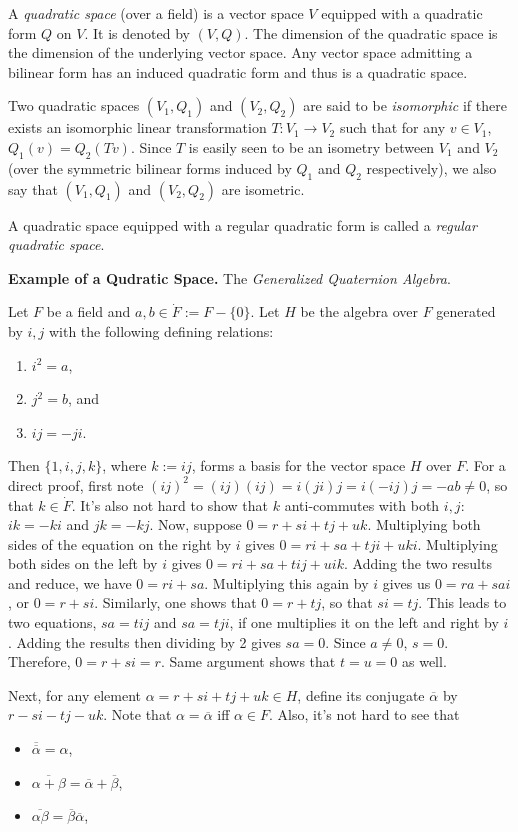 \documentclass[12pt]{article}
\begin{document}
A \emph{quadratic space} (over a field) is a vector space $V$ equipped with a quadratic form $Q$ on $V$.  It is denoted by $(V,Q)$.  The dimension of the quadratic space is the dimension of the underlying vector space.  Any vector space admitting a bilinear form has an induced quadratic form and thus is a quadratic space.

Two quadratic spaces $(V_1,Q_1)$ and $(V_2,Q_2)$ are said to be \emph{isomorphic} if there exists an isomorphic linear transformation $T:V_1\to V_2$ such that for any $v\in V_1$, $Q_1(v)=Q_2(Tv)$.  Since $T$ is easily seen to be an isometry between $V_1$ and $V_2$ (over the symmetric bilinear forms induced by $Q_1$ and $Q_2$ respectively), we also say that $(V_1,Q_1)$ and $(V_2,Q_2)$ are isometric.

A quadratic space equipped with a regular quadratic form is called a \emph{regular quadratic space}.

\textbf{Example of a Qudratic Space.}  The \emph{Generalized Quaternion Algebra}.

Let $F$ be a field and $a,b\in \dot{F}:=F-\lbrace 0\rbrace$.  Let $H$ be the algebra over $F$ generated by $i,j$ with the following defining relations:
\begin{enumerate}
\item $i^2=a$,
\item $j^2=b$, and
\item $ij=-ji$.
\end{enumerate}
Then $\lbrace 1,i,j,k\rbrace$, where $k:=ij$, forms a basis for the vector space $H$ over $F$.  For a direct proof, first note $(ij)^2=(ij)(ij)=i(ji)j=i(-ij)j=-ab\neq 0$, so that $k\in\dot{F}$.  It's also not hard to show that $k$ anti-commutes with both $i,j$: $ik=-ki$ and $jk=-kj$.  Now, suppose $0=r+si+tj+uk$.  Multiplying both sides of the equation on the right by $i$ gives $0=ri+sa+tji+uki$.  Multiplying both sides on the left by $i$ gives $0=ri+sa+tij+uik$.  Adding the two results and reduce, we have $0=ri+sa$.  Multiplying this again by $i$ gives us $0=ra+sai$, or $0=r+si$.  Similarly, one shows that $0=r+tj$, so that $si=tj$.  This leads to two equations, $sa=tij$ and $sa=tji$, if one multiplies it on the left and right by $i$.  Adding the results then dividing by 2 gives $sa=0$.  Since $a\ne 0$, $s=0$.  Therefore, $0=r+si=r$.  Same argument shows that $t=u=0$ as well.

Next, for any element $\alpha=r+si+tj+uk\in H$, define its conjugate $\overline{\alpha}$ by $r-si-tj-uk$.  Note that $\alpha=\overline{\alpha}$ iff $\alpha\in F$.  Also, it's not hard to see that 
\begin{itemize}
\item $\overline{\overline{\alpha}}=\alpha$,
\item $\overline{\alpha+\beta}=\overline{\alpha}+\overline{\beta}$,
\item $\overline{\alpha\beta}=\overline{\beta}\overline{\alpha}$,
\end{itemize}
\end{document}
